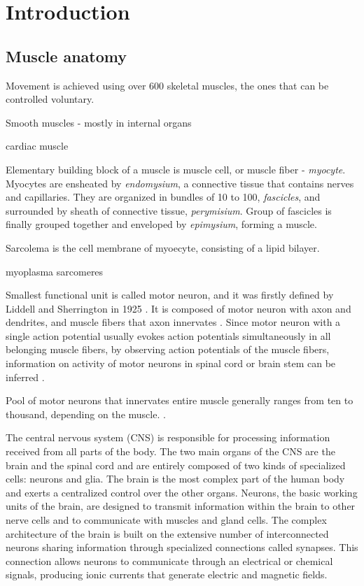 
\chapter{Introduction}





\section{Muscle anatomy}

Movement is achieved using over 600 skeletal muscles, the ones that can be controlled voluntary. 

Smooth muscles - mostly in internal organs

cardiac muscle

Elementary building block of a muscle is muscle cell, or muscle fiber - \emph{myocyte}. Myocytes are ensheated by \emph{endomysium}, a connective tissue that contains nerves and capillaries. They are organized in bundles of 10 to 100, \emph{fascicles}, and surrounded by sheath of connective tissue, \emph{perymisium}. Group of fascicles is finally grouped together and enveloped by \emph{epimysium}, forming a muscle.

Sarcolema is the cell membrane of myoecyte, consisting of a lipid bilayer.

myoplasma
sarcomeres


Smallest functional unit is called motor neuron, and it was firstly defined by Liddell and Sherrington in 1925 \citep{Liddell1925, Sherrington1925}. It is composed of motor neuron with axon and dendrites, and muscle fibers that axon innervates \citep{Duchateau2011}. Since motor neuron with a single action potential usually evokes action potentials simultaneously in all belonging muscle fibers, by observing action potentials of the muscle fibers, information on activity of motor neurons in spinal cord or brain stem can be inferred \citep{Merletti-Farina-book}. %

Pool of motor neurons that innervates entire muscle generally ranges from ten to thousand, depending on the muscle. \citep{Merletti-Farina-book}.


The central nervous system (CNS) is responsible for processing information received from all parts of the body. The two main organs of the CNS are the brain and the spinal cord and are entirely composed of two kinds of specialized cells: neurons and glia. The brain is the most complex part of the human body and exerts a centralized control over the other organs. Neurons, the basic working units of the brain, are designed to transmit information within the brain to other nerve cells and to communicate with muscles and gland cells. The complex architecture of the brain is built on the extensive number of interconnected neurons sharing information through specialized connections called synapses. This connection allows  neurons to communicate through an electrical or chemical signals, producing ionic currents that generate electric and magnetic fields. 

